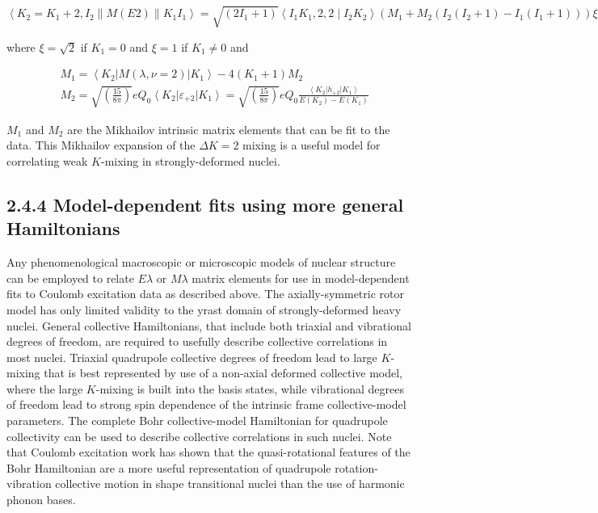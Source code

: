 \documentclass[10pt]{article}
\begin{document}
\begin{equation*}
\left\langle K_{2}=K_{1}+2, I_{2}\|M(E 2)\| K_{1} I_{1}\right\rangle=\sqrt{\left(2 I_{1}+1\right)}\left\langle I_{1} K_{1}, 2,2 \mid I_{2} K_{2}\right\rangle\left(M_{1}+M_{2}\left(I_{2}\left(I_{2}+1\right)-I_{1}\left(I_{1}+1\right)\right)\right) \xi \tag{2.12}
\end{equation*}


where $\xi=\sqrt{2}$ if $K_{1}=0$ and $\xi=1$ if $K_{1} \neq 0$ and


\begin{align*}
& M_{1}=\left\langle K_{2}\right| M(\lambda, \nu=2)\left|K_{1}\right\rangle-4\left(K_{1}+1\right) M_{2}  \tag{2.13}\\
& M_{2}=\sqrt{\left(\frac{15}{8 \pi}\right)} e Q_{0}\left\langle K_{2}\right| \varepsilon_{+2}\left|K_{1}\right\rangle=\sqrt{\left(\frac{15}{8 \pi}\right)} e Q_{0} \frac{\left\langle K_{2}\right| h_{+2}\left|K_{1}\right\rangle}{E\left(K_{2}\right)-E\left(K_{1}\right)}
\end{align*}


$M_{1}$ and $M_{2}$ are the Mikhailov intrinsic matrix elements that can be fit to the data. This Mikhailov expansion of the $\Delta K=2$ mixing is a useful model for correlating weak $K$-mixing in strongly-deformed nuclei.

\subsection*{2.4.4 Model-dependent fits using more general Hamiltonians}
Any phenomenological macroscopic or microscopic models of nuclear structure can be employed to relate $E \lambda$ or $M \lambda$ matrix elements for use in model-dependent fits to Coulomb excitation data as described above. The axially-symmetric rotor model has only limited validity to the yrast domain of strongly-deformed heavy nuclei. General collective Hamiltonians, that include both triaxial and vibrational degrees of freedom, are required to usefully describe collective correlations in most nuclei. Triaxial quadrupole collective degrees of freedom lead to large $K$-mixing that is best represented by use of a non-axial deformed collective model, where the large $K$-mixing is built into the basis states, while vibrational degrees of freedom lead to strong spin dependence of the intrinsic frame collective-model parameters. The complete Bohr collective-model Hamiltonian for quadrupole collectivity can be used to describe collective correlations in such nuclei. Note that Coulomb excitation work has shown that the quasi-rotational features of the Bohr Hamiltonian are a more useful representation of quadrupole rotation-vibration collective motion in shape transitional nuclei than the use of harmonic phonon bases.
\end{document}
